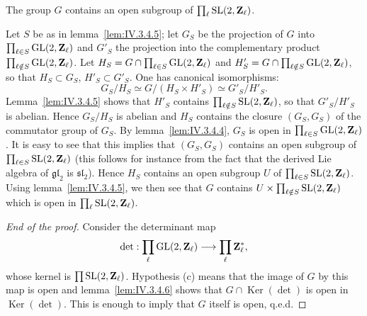 \begin{lemma}[6]\label{lem:IV.3.4.6}
The group $G$ contains an open subgroup of $\prod_{\ell} \mathrm{SL}(2,\mathbf{Z}_\ell)$.
\end{lemma}

Let $S$ be as in lemma~\ref{lem:IV.3.4.5}; let $G_S$ be the projection of $G$ into $\prod_{\ell \in S} \mathrm{GL}(2,\mathbf{Z}_\ell)$ and $G'_S$ the projection into the complementary product $\prod_{\ell \notin S} \mathrm{GL}(2,\mathbf{Z}_\ell)$. Let $H_S = G \cap \prod_{\ell \in S} \mathrm{GL}(2,\mathbf{Z}_\ell)$ and $H'_S = G \cap \prod_{\ell \notin S} \mathrm{GL}(2,\mathbf{Z}_\ell)$, so that $H_S \subset G_S$, $H'_S \subset G'_S$. One has canonical isomorphisms:
\[
  G_S / H_S \simeq G / (H_S \times H'_S) \simeq G'_S / H'_S.
\]
Lemma~\ref{lem:IV.3.4.5} shows that $H'_S$ contains $\prod_{\ell \notin S} \mathrm{SL}(2,\mathbf{Z}_\ell)$, so that $G'_S / H'_S$ is abelian. Hence $G_S / H_S$ is abelian and $H_S$ contains the closure $(G_S,G_S)$ of the commutator group of $G_S$. By lemma~\ref{lem:IV.3.4.4}, $G_S$ is open in $\prod_{\ell \in S} \mathrm{GL}(2,\mathbf{Z}_\ell)$. It is easy to see that this implies that $(G_S,G_S)$ contains an open subgroup of $\prod_{\ell \in S} \mathrm{SL}(2,\mathbf{Z}_\ell)$ (this follows for instance from the fact that the derived Lie algebra of $\mathfrak{gl}_2$ is $\mathfrak{sl}_2$). Hence $H_S$ contains an open subgroup $U$ of $\prod_{\ell \in S} \mathrm{SL}(2,\mathbf{Z}_\ell)$. Using lemma~\ref{lem:IV.3.4.5}, we then see that $G$ contains $U \times \prod_{\ell \notin S} \mathrm{SL}(2,\mathbf{Z}_\ell)$ which is open in $\prod_{\ell} \mathrm{SL}(2,\mathbf{Z}_\ell)$.

\begin{proof}[End of the proof]
Consider the determinant map
\[
  \det : \prod_{\ell} \mathrm{GL}(2,\mathbf{Z}_\ell) \longrightarrow \prod_{\ell} \mathbf{Z}_\ell^{*},
\]
whose kernel is $\prod \mathrm{SL}(2,\mathbf{Z}_\ell)$. Hypothesis (c) means that the image of $G$ by this map is open and lemma~\ref{lem:IV.3.4.6} shows that $G \cap \operatorname{Ker}(\det)$ is open in $\operatorname{Ker}(\det)$. This is enough to imply that $G$ itself is open, q.e.d.
\end{proof}

